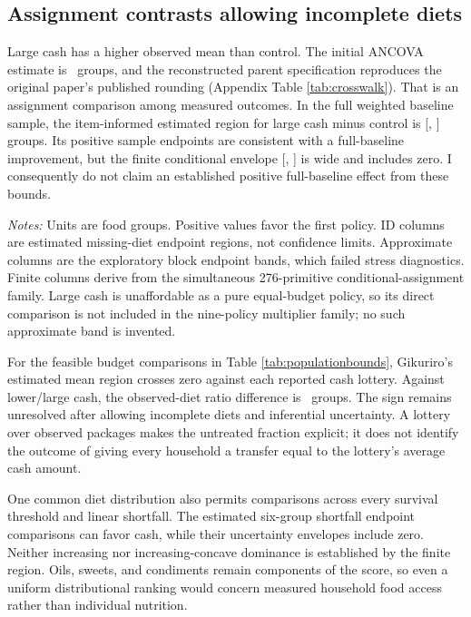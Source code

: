 \documentclass[11pt]{article}
\begin{document}
\subsection{Assignment contrasts allowing incomplete diets}

Large cash has a higher observed mean than control. The initial ANCOVA estimate is \LargeDietEstimate\ groups, and the reconstructed parent specification reproduces the original paper's published rounding (Appendix Table \ref{tab:crosswalk}). That is an assignment comparison among measured outcomes. In the full weighted baseline sample, the item-informed estimated region for large cash minus control is [\LargeIdentificationLo, \LargeIdentificationHi] groups. Its positive sample endpoints are consistent with a full-baseline improvement, but the finite conditional envelope [\LargeFiniteLo, \LargeFiniteHi] is wide and includes zero. I consequently do not claim an established positive full-baseline effect from these bounds.

\begin{table}[t]
\centering\caption{Mean dietary comparisons for the eligible weighted baseline sample}\label{tab:populationbounds}
\resizebox{\textwidth}{!}{}
\begin{minipage}{\textwidth}\footnotesize\emph{Notes:} Units are food groups. Positive values favor the first policy. ID columns are estimated missing-diet endpoint regions, not confidence limits. Approximate columns are the exploratory block endpoint bands, which failed stress diagnostics. Finite columns derive from the simultaneous 276-primitive conditional-assignment family. Large cash is unaffordable as a pure equal-budget policy, so its direct comparison is not included in the nine-policy multiplier family; no such approximate band is invented.\end{minipage}
\end{table}

For the feasible budget comparisons in Table \ref{tab:populationbounds}, Gikuriro's estimated mean region crosses zero against each reported cash lottery. Against lower/large cash, the observed-diet ratio difference is \HajekLowerLargeEstimate\ groups. The sign remains unresolved after allowing incomplete diets and inferential uncertainty. A lottery over observed packages makes the untreated fraction explicit; it does not identify the outcome of giving every household a transfer equal to the lottery's average cash amount.

One common diet distribution also permits comparisons across every survival threshold and linear shortfall. The estimated six-group shortfall endpoint comparisons can favor cash, while their uncertainty envelopes include zero. Neither increasing nor increasing-concave dominance is established by the finite region. Oils, sweets, and condiments remain components of the score, so even a uniform distributional ranking would concern measured household food access rather than individual nutrition.
\end{document}
